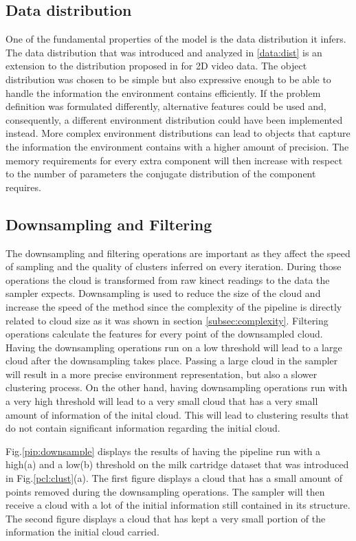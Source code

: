 \documentclass[twoside,hidelinks]{article}
\begin{document}
 
\subsection{Data distribution}

One of the fundamental properties of the model is the data distribution it infers. 
The data distribution that was introduced and analyzed in \ref{data:dist}  is an extension to the distribution proposed in \cite{dependentDiri} for 2D video data.
The object distribution was chosen to be simple but also expressive enough to be able to handle the information the environment contains efficiently.
If the problem definition was formulated differently, alternative features could be used and, consequently, a different environment distribution could have been implemented instead.
More complex environment distributions can lead to objects that capture the information the environment contains with a higher amount of precision. 
The memory requirements for every extra component will then increase with respect to the number of parameters the conjugate distribution of the component requires. 
 
\subsection{Downsampling and Filtering}

The downsampling and filtering operations are important as they affect the speed of sampling and the quality of clusters inferred on every iteration. 
During those operations the cloud is transformed from raw kinect readings to the data the sampler expects.
Downsampling is used to reduce the size of the cloud and increase the speed of the method since the complexity of the pipeline is directly related to cloud size as it was shown in section \ref{subsec:complexity}. Filtering operations calculate the features for every point of the downsampled cloud.
Having the downsampling operations run on a low threshold will lead to a large cloud after the downsampling takes place. 
Passing a large cloud in the sampler will result in a more precise environment representation, but also a slower clustering process.
On the other hand, having downsampling operations run with a very high threshold will lead to a very small cloud that has a very small amount of information of the inital cloud. This will lead to clustering results that do not contain significant information regarding the initial cloud.

Fig.\ref{pip:downsample} displays the results of having the pipeline run with a high(a) and a low(b) threshold on the milk cartridge dataset that was introduced in Fig.\ref{pcl:clust}(a).
The first figure displays a cloud that has a small amount of points removed during the downsampling operations. The sampler will then receive a cloud with a lot of the initial information still contained in its structure.
The second figure displays a cloud that has kept a very small portion of the information the initial cloud carried.
\end{document}
